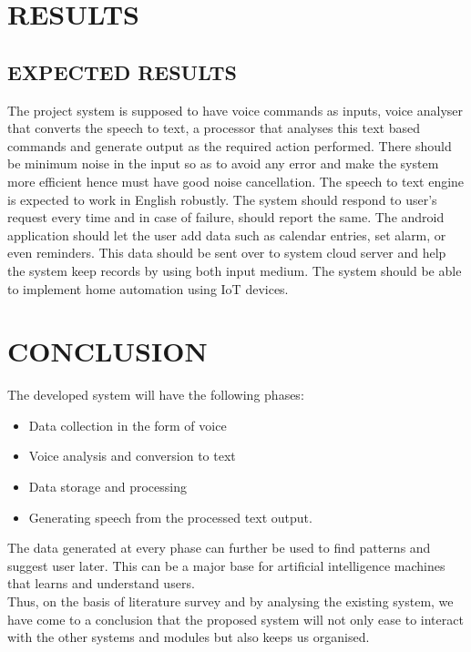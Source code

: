 \documentclass[12pt]{extreport}
\begin{document}
\chapter{RESULTS}
\section{EXPECTED RESULTS}
\hspace*{3em}The project system is supposed to have voice commands as inputs, voice analyser that converts the speech to text, a processor that analyses this text based commands and generate output as the required action performed. There should be minimum noise in the input so as to avoid any error and make the system more efficient hence must have good noise cancellation. The speech to text engine is expected to work in English robustly. The system should respond to user’s request every time and in case of failure, should report the same. The android application should let the user add data such as calendar entries, set alarm, or even reminders. This data should be sent over to system cloud server and help the system keep records by using both input medium. The system should be able to implement home automation using IoT devices.

\chapter{CONCLUSION}
\noindent
The developed system will have the following phases:
\begin{itemize}
\item Data collection in the form of voice
\item Voice analysis and conversion to text
\item Data storage and processing
\item Generating speech from the processed text output.
\end{itemize}
The data generated at every phase can further be used to find patterns and suggest user later. This can be a major base for artificial intelligence machines that learns and understand users.\\
\noindent
Thus, on the basis of literature survey and by analysing the existing system, we have come to a conclusion that the proposed system will not only ease to interact with the other systems and modules but also keeps us organised.
\end{document}

